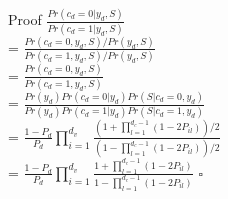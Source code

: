 \documentclass{beamer}
\begin{document}
\begin{frame}
    \begin{block}{Proof}
        \Large{
          $\frac{Pr(c_d = 0|y_d, S)}{Pr(c_d = 1|y_d, S)}$\\
        = $\frac{Pr(c_d=0,y_d,S)/Pr(y_d,S)}{Pr(c_d=1,y_d,S)/Pr(y_d,S)}$\\
        = $\frac{Pr(c_d=0,y_d,S)}{Pr(c_d=1,y_d,S)}$\\
        = $\frac{Pr(y_d)Pr(c_d=0|y_d)Pr(S|c_d=0,y_d)}{Pr(y_d)Pr(c_d=1|y_d)Pr(S|c_d=1,y_d)}$\\
        = $\frac{1-P_d}{P_d}\prod_{i=1}^{d_v}\frac{(1+\prod_{l=1}^{d_c-1}(1-2P_{il}))/2}{(1-\prod_{l=1}^{d_c-1}(1-2P_{il}))/2}$\\
        = $\frac{1-P_d}{P_d}\prod_{i=1}^{d_v}\frac{1+\prod_{l=1}^{d_c-1}(1-2P_{il})}{1-\prod_{l=1}^{d_c-1}(1-2P_{il})}$
        }\quad \quad \quad \quad \quad \quad \quad \quad \quad $\square$
    \end{block}
\end{frame}
\end{document}
